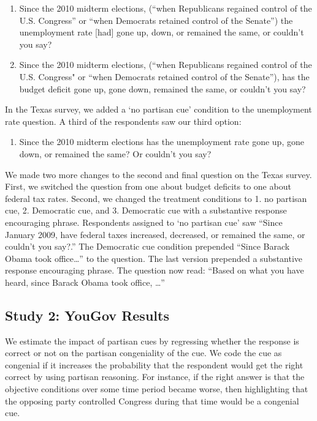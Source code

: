 \documentclass[12pt, letterpaper]{article}
\begin{document}
\begin{enumerate}
\item Since the 2010 midterm elections, (``when Republicans regained control of the U.S. Congress'' or ``when Democrats retained control of the Senate'') the unemployment rate [had] gone up, down, or remained the same, or couldn't you say? 
\item Since the 2010 midterm elections, (``when Republicans regained control of the U.S. Congress" or ``when Democrats retained control of the Senate''), has the budget deficit gone up, gone down, remained the same, or couldn't you say?
\end{enumerate}

In the Texas survey, we added a `no partisan cue' condition to the unemployment rate question. A third of the respondents saw our third option: 

\begin{enumerate}\addtocounter{enumi}{+2}
    \item Since the 2010 midterm elections has the unemployment rate gone up, gone down, or remained the same? Or couldn't you say?
\end{enumerate}

We made two more changes to the second and final question on the Texas survey. First, we switched the question from one about budget deficits to one about federal tax rates. Second, we changed the treatment conditions to 1. no partisan cue, 2. Democratic cue, and 3. Democratic cue with a substantive response encouraging phrase. Respondents assigned to `no partisan cue' saw ``Since January 2009, have federal taxes increased, decreased, or remained the same, or couldn't you say?.'' The Democratic cue condition prepended ``Since Barack Obama took office\ldots'' to the question. The last version prepended a substantive response encouraging phrase. The question now read: ``Based on what you have heard, since Barack Obama took office, \ldots''

\subsection*{Study 2: YouGov Results}\label{subsec:yougov_results}

We estimate the impact of partisan cues by regressing whether the response is correct or not on the partisan congeniality of the cue. We code the cue as congenial if it increases the probability that the respondent would get the right correct by using partisan reasoning. For instance, if the right answer is that the objective conditions over some time period became worse, then highlighting that the opposing party controlled Congress during that time would be a congenial cue.
\end{document}
